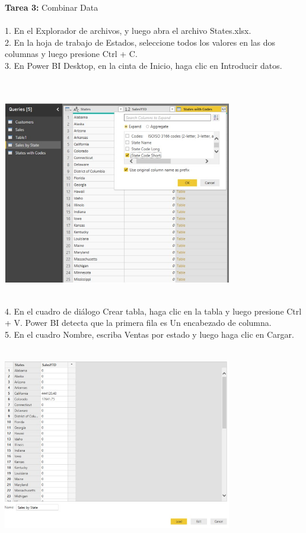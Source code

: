 \begin{flushleft}
\begin{itemize}
\textbf{ }\\
\textbf{ }\\
\textbf{ }\\
\textbf{Tarea 3: }Combinar Data  \\
\textbf{ }\\

1. En el Explorador de archivos, y luego abra el archivo States.xlsx.\\
2. En la hoja de trabajo de Estados, seleccione todos los valores en las dos columnas y luego presione Ctrl + C.\\
3. En Power BI Desktop, en la cinta de Inicio, haga clic en Introducir datos.\\


\textbf{ }\\
\textbf{ }\\
\begin{center}
	\includegraphics[width=10cm]{./Imagenes/image26} 
	\end{center}
\textbf{ }\\
4. En el cuadro de diálogo Crear tabla, haga clic en la tabla y luego presione Ctrl + V. Power BI detecta que la primera fila es
Un encabezado de columna.\\
5. En el cuadro Nombre, escriba Ventas por estado y luego haga clic en Cargar.\\

\textbf{ }\\
\begin{center}
	\includegraphics[width=10cm]{./Imagenes/image27} 
	\end{center}
\textbf{ }\\


\end{itemize}
\end{flushleft}
